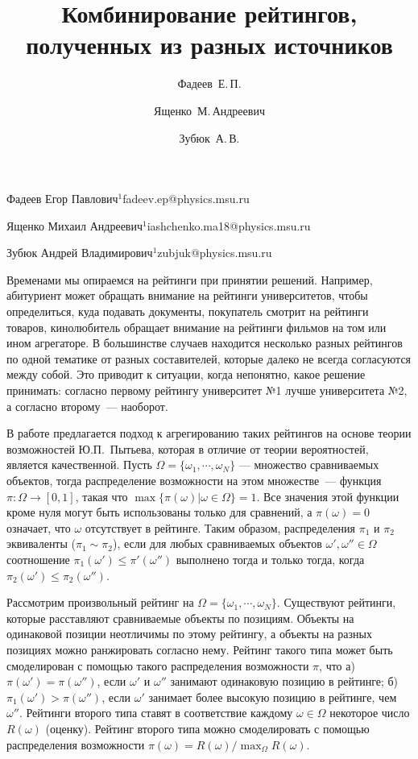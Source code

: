 \documentclass[twoside]{article}
\begin{document}
\Russian
\title{Комбинирование рейтингов, полученных из разных источников}
\author{Фадеев~Е.\,П.}{Фадеев Егор Павлович$^1$\speaker}{fadeev.ep@physics.msu.ru}
\author{Ященко~М.\,Андреевич}{Ященко Михаил Андреевич$^1$}{iashchenko.ma18@physics.msu.ru}
\author{Зубюк~А.\,В.}{Зубюк Андрей Владимирович$^1$}{zubjuk@physics.msu.ru}
\maketitle

Временами мы опираемся на рейтинги при принятии решений. Например, абитуриент может обращать внимание на рейтинги университетов, чтобы определиться, куда подавать документы, покупатель смотрит на рейтинги товаров, кинолюбитель обращает внимание на рейтинги фильмов на том или ином агрегаторе. В большинстве случаев находится несколько разных рейтингов по одной тематике от разных составителей, которые далеко не всегда согласуются между собой. Это приводит к ситуации, когда непонятно, какое решение принимать: согласно первому рейтингу университет №1 лучше университета №2, а согласно второму~--- наоборот. 

В работе предлагается подход к агрегированию таких рейтингов на основе теории возможностей Ю.П.~Пытьева, которая в отличие от теории вероятностей, является качественной. Пусть $\Omega = \{\omega_1, \cdots, \omega_N\}$ --- множество сравниваемых объектов, тогда распределение возможности на этом множестве~--- функция $\pi:\Omega \to [0, 1]$, такая что $\max\{\pi(\omega)|\omega\in\Omega\}=1$. Все значения этой функции кроме нуля могут быть использованы только для сравнений, а $\pi(\omega) = 0$ означает, что $\omega$ отсутствует в рейтинге. Таким образом, распределения $\pi_1$ и $\pi_2$ эквиваленты ($\pi_1\sim\pi_2$), если для любых сравниваемых объектов $\omega', \omega''\in \Omega$ соотношение $\pi_1(\omega') \leq \pi'(\omega'')$ выполнено тогда и только тогда, когда $\pi_2(\omega') \leq \pi_2(\omega'')$.

Рассмотрим произвольный рейтинг на $\Omega = \{\omega_1, \cdots, \omega_N\}$. Существуют рейтинги, которые расставляют сравниваемые объекты по позициям. Объекты на одинаковой позиции неотличимы по этому рейтингу, а объекты на разных позициях можно ранжировать согласно нему. Рейтинг такого типа может быть смоделирован с помощью такого распределения возможности $\pi$, что а) $\pi(\omega') = \pi(\omega'')$, если $\omega'$ и $\omega''$ занимают одинаковую позицию в рейтинге; б) $\pi_1(\omega') > \pi(\omega'')$, если $\omega'$ занимает более высокую позицию в рейтинге, чем $\omega''$. Рейтинги второго типа ставят в соответствие каждому $\omega\in\Omega$ некоторое число $R(\omega)$ (оценку). Рейтинг второго типа можно смоделировать с помощью распределения возможности $\pi(\omega) = {R(\omega)}/{\max_\Omega R(\omega)}$.
\end{document}
